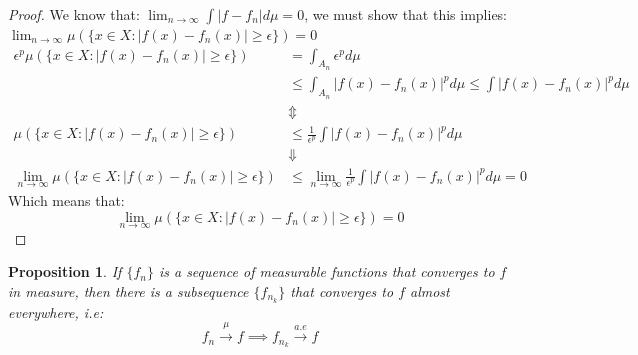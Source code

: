 \documentclass{article}
\newtheorem{prop}{Proposition}
\newtheorem{proof}{Proof}
\begin{document}
\begin{proof}
We know that: $\lim_{n\to \infty}\int |f-f_{n}|d\mu = 0$, we must show that this implies: $\lim_{n\to \infty}\mu(\{x\in X: |f(x)-f_{n}(x)|\geq \epsilon\}) = 0$
\begin{align*}
\epsilon^{p}\mu(\{x\in X: |f(x)-f_{n}(x)|\geq \epsilon\}) &= \int_{A_{n}} \epsilon^{p}d\mu\\ 
&\leq \int_{A_{n}}|f(x)-f_{n}(x)|^{p}d\mu \leq \int|f(x)-f_{n}(x)|^{p}d\mu \\ 
&\Updownarrow \\ 
\mu(\{x\in X: |f(x)-f_{n}(x)|\geq \epsilon\}) &\leq \frac{1}{\epsilon^{p}} \int|f(x)-f_{n}(x)|^{p}d\mu \\
&\Downarrow\\
\lim_{n\to \infty} \mu(\{x\in X: |f(x)-f_{n}(x)|\geq \epsilon\}) &\leq 
\lim_{n\to \infty} \frac{1}{\epsilon^{p}} \int|f(x)-f_{n}(x)|^{p}d\mu = 0
\end{align*}
Which means that: 
\[\lim_{n\to \infty} \mu(\{x\in X: |f(x)-f_{n}(x)|\geq \epsilon\}) = 0
\]
\end{proof}


\begin{prop}
If $\{f_{n}\}$ is a sequence of measurable functions that converges to $f$ in measure, then there is a subsequence $\{f_{n_{k}}\}$ that converges to $f$ almost everywhere, i.e: 
\[f_n \overset{\mu}{\longrightarrow} f \implies f_{n_{k}} \overset{a.e}{\longrightarrow} f
\]
\end{prop}
\end{document}
